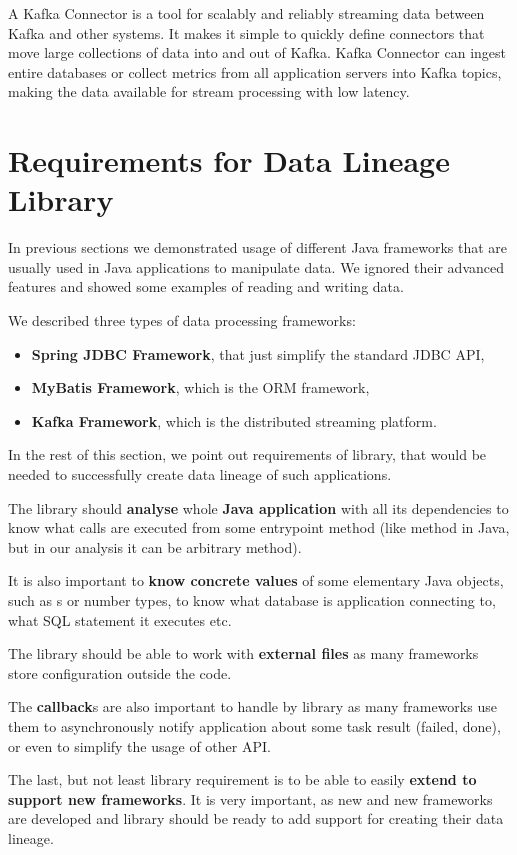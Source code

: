 A Kafka Connector is a tool for scalably and reliably streaming data between Kafka
and other systems. It makes it simple to quickly define connectors that move
large collections of data into and out of Kafka.
Kafka Connector can ingest entire databases or collect metrics from all
application servers into Kafka topics, making the data available
for stream processing with low latency.




\section{Requirements for Data Lineage Library \label{frameworks:requirements}}

In previous sections we demonstrated usage of different Java frameworks
that are usually used in Java applications to manipulate data.
We ignored their advanced features and showed some examples of reading
and writing data.

We described three types of data processing frameworks:
\begin{itemize}
  \item \textbf{Spring JDBC Framework}, that just simplify the standard JDBC API,
  \item \textbf{MyBatis Framework}, which is the ORM framework,
  \item \textbf{Kafka Framework}, which is the distributed streaming platform.
\end{itemize}

In the rest of this section, we point out requirements of library, that
would be needed to successfully create data lineage of such applications.

The library should \textbf{analyse} whole \textbf{Java application} with all
its dependencies to know what calls are executed from some
entrypoint method (like  method in Java, but in
our analysis it can be arbitrary method).

It is also important to \textbf{know concrete values} of some elementary Java
objects, such as s or number types, to know
what database is application connecting to, what SQL statement
it executes etc.

The library should be able to work with \textbf{external files}
as many frameworks store configuration outside the code.

The \textbf{callback}s are also important to handle by library
as many frameworks use them to asynchronously notify application about
some task result (failed, done), or even to simplify the usage of other API.

The last, but not least library requirement is to be able to easily
\textbf{extend to support new frameworks}. It is very important,
as new and new frameworks are developed and library should be ready
to add support for creating their data lineage.




